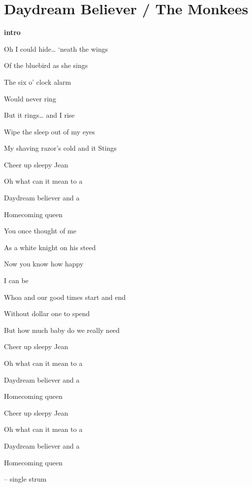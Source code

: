 \section{Daydream Believer / The Monkees}\label{sec:daydreambeliever}

\Gmajor
\Aminor
\Bminor
\EminorSeven
\Aseven
\Dseven
\DmajorEasy
\Eminor


\textbf{intro} 

Oh I could hide… ‘neath the wings

Of the bluebird as she sings

The six o’ clock alarm

Would never ring 

But it rings… and I rise

Wipe the sleep out of my eyes

My shaving razor’s cold and it
Stings

Cheer up sleepy Jean

Oh what can it mean to a

 Daydream believer and a

 Homecoming queen

You once thought of me

As a white knight on his steed

Now you know how happy

I can be 

Whoa and our good times start and end

Without dollar one to spend

But how much baby do we really need

Cheer up sleepy Jean

Oh what can it mean to a

 Daydream believer and a

 Homecoming queen 

Cheer up sleepy Jean

Oh what can it mean to a

 Daydream believer and a

 Homecoming queen 

 – single strum
